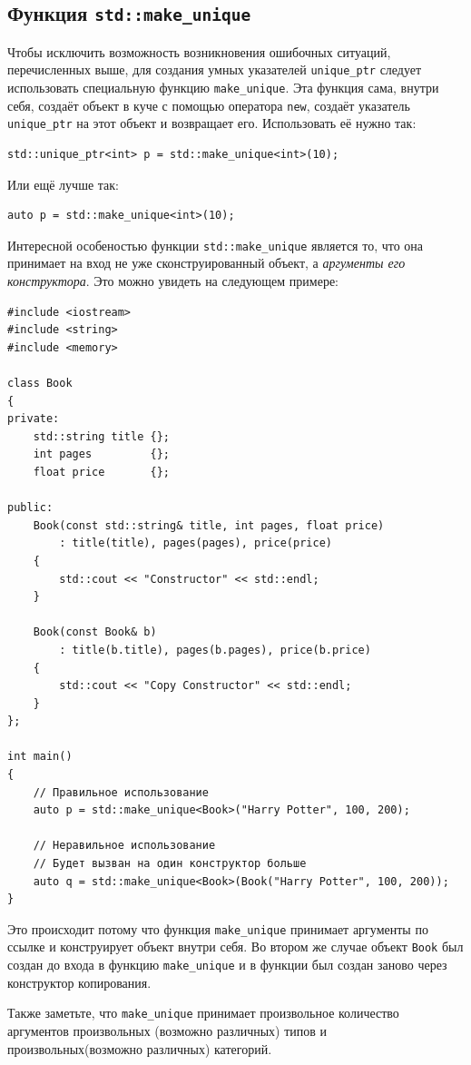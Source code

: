 \documentclass{article}
\begin{document}
\newpage
\subsection*{Функция \texttt{std::make\_unique}}
Чтобы исключить возможность возникновения ошибочных ситуаций, перечисленных выше, для создания умных указателей \texttt{unique\_ptr} следует использовать специальную функцию \texttt{make\_unique}. Эта функция сама, внутри себя, создаёт объект в куче с помощью оператора \texttt{new}, создаёт указатель \texttt{unique\_ptr} на этот объект и возвращает его. Использовать её нужно так:
\begin{lstlisting}
std::unique_ptr<int> p = std::make_unique<int>(10);
\end{lstlisting}
Или ещё лучше так:
\begin{lstlisting}
auto p = std::make_unique<int>(10);
\end{lstlisting}
Интересной особеностью функции \texttt{std::make\_unique} является то, что она принимает на вход не уже сконструированный объект, а \textit{аргументы его конструктора}. Это можно увидеть на следующем примере:
\begin{lstlisting}
#include <iostream>
#include <string>
#include <memory>

class Book
{
private:
	std::string title {};
	int pages         {};
	float price       {};

public:
	Book(const std::string& title, int pages, float price)
		: title(title), pages(pages), price(price)
	{
		std::cout << "Constructor" << std::endl;
	}
	
	Book(const Book& b)
		: title(b.title), pages(b.pages), price(b.price)
	{
		std::cout << "Copy Constructor" << std::endl;
	}
};

int main()
{
	// Правильное использование
	auto p = std::make_unique<Book>("Harry Potter", 100, 200);
	
	// Неравильное использование
	// Будет вызван на один конструктор больше
	auto q = std::make_unique<Book>(Book("Harry Potter", 100, 200));
}
\end{lstlisting}
Это происходит потому что функция \texttt{make\_unique} принимает аргументы по ссылке и конструирует объект внутри себя. Во втором же случае объект \texttt{Book} был создан до входа в функцию \texttt{make\_unique} и в функции был создан заново через конструктор копирования. 

Также заметьте, что \texttt{make\_unique} принимает произвольное количество аргументов произвольных (возможно различных) типов и произвольных(возможно различных) категорий. 
\end{document}
